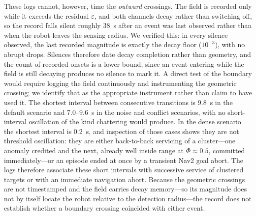 These logs cannot, however, time the \emph{outward} crossings. The field is recorded
only while it exceeds the residual $\varepsilon$, and both channels decay rather than
switching off, so the record falls silent roughly $38$~s after an event was last
observed rather than when the robot leaves the sensing radius. We verified this: in
every silence observed, the last recorded magnitude is exactly the decay floor
($10^{-3}$), with no abrupt drops. Silences therefore date decay completion rather
than geometry, and the count of recorded onsets is a lower bound, since an event
entering while the field is still decaying produces no silence to mark it. A direct
test of the boundary would require logging the field continuously and instrumenting
the geometric crossing; we identify that as the appropriate instrument rather than
claim to have used it. The shortest interval
between consecutive transitions is $9.8$~s in the default scenario and $7.0$--$9.6$~s
in the noise and conflict scenarios, with no short-interval oscillation of the
kind chattering would produce. In the
dense scenario the shortest interval is $0.2$~s, and inspection of those cases shows
they are not threshold oscillation: they are either back-to-back servicing of a
cluster---one anomaly credited and the next, already well inside range at
$\Phi\approx0.5$, committed immediately---or an episode ended at once by a transient
Nav2 goal abort. The logs therefore associate these short intervals with successive
service of clustered targets or with an immediate navigation abort. Because the
geometric crossings are not timestamped and the field carries decay memory---so its
magnitude does not by itself locate the robot relative to the detection radius---the
record does not establish whether a boundary crossing coincided with either event.


